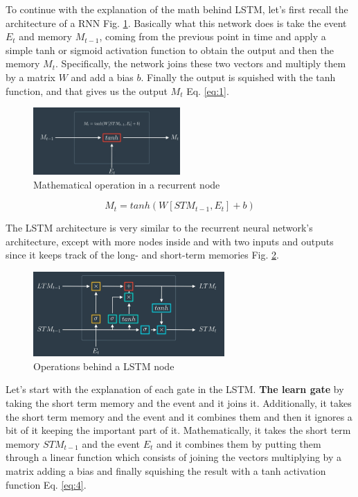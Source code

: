 \documentclass{article}
\begin{document}
To continue with the explanation of the math behind LSTM, let's first recall the architecture of a RNN Fig. \ref{fig:f9}. Basically what this network does is take the event \(E_t\) and memory \(M_{t-1}\), coming from the previous point in time and apply a simple tanh or sigmoid activation function to obtain the output and then the memory \(M_t\). Specifically, the network joins these two vectors and multiply them by a matrix \(W\) and add a bias \(b\). Finally the output is squished with the tanh function, and that gives us the output \(M_t\) Eq. \eqref{eq:1}.

\begin{figure}[ht]
    \centering
    \includegraphics[width=0.5\textwidth,height=0.5\textheight,keepaspectratio]{images/recurrent_node.png}
    \captionsetup{justification=centering}
    \caption{Mathematical operation in a recurrent node}
    \label{fig:f9}
\end{figure}


\begin{equation}
M_t = tanh(W[ST M_{t-1}, E_t] + b)
\label{eq:1}
\end{equation}

The LSTM architecture is very similar to the recurrent neural network's architecture, except with more nodes inside and with two inputs and outputs since it keeps track of the long- and short-term memories Fig. \ref{fig:f10}.

\begin{figure}[ht]
    \centering
    \includegraphics[width=0.65\textwidth,height=0.65\textheight,keepaspectratio]{images/lstm_node.png}
    \captionsetup{justification=centering}
    \caption{Operations behind a LSTM node}
    \label{fig:f10}
\end{figure}

Let's start with the explanation of each gate in the LSTM. \textbf{The learn gate} by taking the short term memory and the event and it joins it. Additionally, it takes the short term memory and the event and it combines them and then it ignores a bit of it keeping the important part of it. Mathematically, it takes the short term memory \(STM_{t-1}\) and the event \(E_t\) and it combines them by putting them through a linear function which consists of joining the vectors multiplying by a matrix adding a bias and finally squishing the result with a tanh activation function Eq. \eqref{eq:4}.
\end{document}
